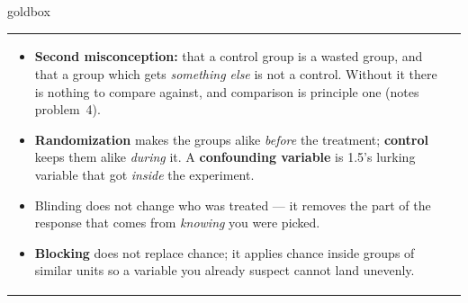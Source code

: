\documentclass[10pt]{article}
\begin{document}
\begin{skillbox}{goldbox}
\begin{tabularx}{\linewidth}{@{}X|X@{}}
\begin{itemize}[leftmargin=1.1em, nosep, after=\vspace{2pt}]
  \item \textbf{Second misconception:} that a control group is a wasted group, and that a
        group which gets \emph{something else} is not a control. Without it there is nothing
        to compare against, and comparison is principle one (notes problem~4).
  \item \textbf{Randomization} makes the groups alike \emph{before} the treatment;
        \textbf{control} keeps them alike \emph{during} it. A \textbf{confounding variable} is
        1.5's lurking variable that got \emph{inside} the experiment.
  \item Blinding does not change who was treated --- it removes the part of the response that
        comes from \emph{knowing} you were picked.
  \item \textbf{Blocking} does not replace chance; it applies chance inside groups of similar
        units so a variable you already suspect cannot land unevenly.
\end{itemize}
\end{tabularx}
\end{skillbox}
\end{document}
